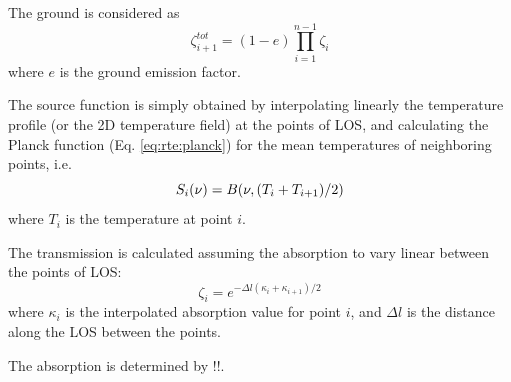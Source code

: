  The ground is considered as
 \begin{equation}
   \zeta_{i+1}^{tot} = (1-e)\prod_{i=1}^{n-1}\zeta_{i}
  \label{eq:rte:tground}
 \end{equation} 
 where $e$ is the ground emission factor.
 

 \label{sec:rte:calc}
   
 The source function is simply obtained by interpolating linearly the
 temperature profile (or the 2D temperature field) at the points of
 LOS, and calculating the Planck function (Eq. \ref{eq:rte:planck}) for
 the mean temperatures of neighboring points, i.e.
 \begin{equation}
   S_i(\nu) = B(\nu,(T_i+T_{i+1})/2)
  \label{eq:rte:planck2}
 \end{equation}
 where $T_i$ is the temperature at point $i$.
  
 The transmission is calculated assuming the absorption to vary
 linear between the points of LOS:
 \begin{equation}
   \zeta_i = e^{-\Delta l \left(\kappa_i+\kappa_{i+1}\right)/2 }
  \label{eq:rte:transm}
 \end{equation}
 where $\kappa_i$ is the interpolated absorption value for point $i$, and
 $\Delta l$ is the distance along the LOS between the points. 

 The absorption is determined by !!.



